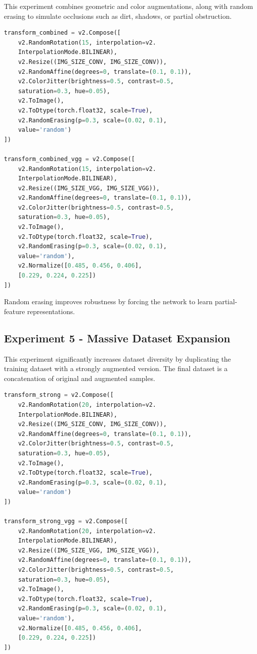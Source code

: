\documentclass[conference,a4paper]{IEEEtran}
\begin{document}
This experiment combines geometric and color augmentations, along with random erasing to simulate occlusions such as dirt, shadows, or partial obstruction.

\begin{lstlisting}[language=Python]
transform_combined = v2.Compose([
    v2.RandomRotation(15, interpolation=v2.
    InterpolationMode.BILINEAR),
    v2.Resize((IMG_SIZE_CONV, IMG_SIZE_CONV)),
    v2.RandomAffine(degrees=0, translate=(0.1, 0.1)),
    v2.ColorJitter(brightness=0.5, contrast=0.5,
    saturation=0.3, hue=0.05),
    v2.ToImage(),
    v2.ToDtype(torch.float32, scale=True),
    v2.RandomErasing(p=0.3, scale=(0.02, 0.1),
    value='random')
])

transform_combined_vgg = v2.Compose([
    v2.RandomRotation(15, interpolation=v2.
    InterpolationMode.BILINEAR),
    v2.Resize((IMG_SIZE_VGG, IMG_SIZE_VGG)),
    v2.RandomAffine(degrees=0, translate=(0.1, 0.1)),
    v2.ColorJitter(brightness=0.5, contrast=0.5,
    saturation=0.3, hue=0.05),
    v2.ToImage(),
    v2.ToDtype(torch.float32, scale=True),
    v2.RandomErasing(p=0.3, scale=(0.02, 0.1),
    value='random'),
    v2.Normalize([0.485, 0.456, 0.406],
    [0.229, 0.224, 0.225])
])
\end{lstlisting}

Random erasing improves robustness by forcing the network to learn partial-feature representations.

\subsection{Experiment 5 - Massive Dataset Expansion}

This experiment significantly increases dataset diversity by duplicating the training dataset with a strongly augmented version. The final dataset is a concatenation of original and augmented samples.

\begin{lstlisting}[language=Python]
transform_strong = v2.Compose([
    v2.RandomRotation(20, interpolation=v2.
    InterpolationMode.BILINEAR),
    v2.Resize((IMG_SIZE_CONV, IMG_SIZE_CONV)),
    v2.RandomAffine(degrees=0, translate=(0.1, 0.1)),
    v2.ColorJitter(brightness=0.5, contrast=0.5,
    saturation=0.3, hue=0.05),
    v2.ToImage(),
    v2.ToDtype(torch.float32, scale=True),
    v2.RandomErasing(p=0.3, scale=(0.02, 0.1),
    value='random')
])

transform_strong_vgg = v2.Compose([
    v2.RandomRotation(20, interpolation=v2.
    InterpolationMode.BILINEAR),
    v2.Resize((IMG_SIZE_VGG, IMG_SIZE_VGG)),
    v2.RandomAffine(degrees=0, translate=(0.1, 0.1)),
    v2.ColorJitter(brightness=0.5, contrast=0.5,
    saturation=0.3, hue=0.05),
    v2.ToImage(),
    v2.ToDtype(torch.float32, scale=True),
    v2.RandomErasing(p=0.3, scale=(0.02, 0.1),
    value='random'),
    v2.Normalize([0.485, 0.456, 0.406],
    [0.229, 0.224, 0.225])
])
\end{lstlisting}
\end{document}
